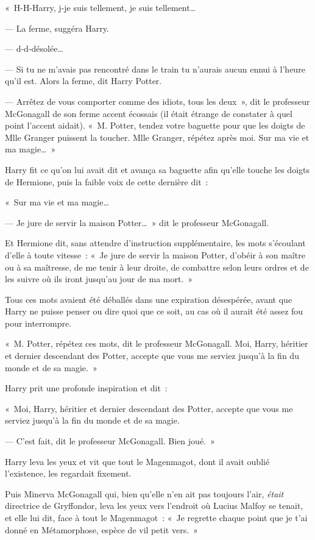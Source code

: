 «~H-H-Harry, j-je suis tellement, je suis tellement…

--- La ferme, suggéra Harry.

--- d-d-désolée…

--- Si tu ne m'avais pas rencontré dans le train tu n'aurais aucun ennui à l'heure qu'il est. Alors la ferme, dit Harry Potter.

--- Arrêtez de vous comporter comme des idiots, tous les deux~», dit le professeur McGonagall de son ferme accent écossais (il était étrange de constater à quel point l'accent aidait). «~M. Potter, tendez votre baguette pour que les doigts de Mlle Granger puissent la toucher. Mlle Granger, répétez après moi. Sur ma vie et ma magie…~»

Harry fit ce qu'on lui avait dit et avança sa baguette afin qu'elle touche les doigts de Hermione, puis la faible voix de cette dernière dit~:

«~Sur ma vie et ma magie…

--- Je jure de servir la maison Potter…~» dit le professeur McGonagall.

Et Hermione dit, sans attendre d'instruction supplémentaire, les mots s'écoulant d'elle à toute vitesse~: «~Je jure de servir la maison Potter, d'obéir à son maître ou à sa maîtresse, de me tenir à leur droite, de combattre selon leurs ordres et de les suivre où ils iront jusqu'au jour de ma mort.~»

Tous ces mots avaient été déballés dans une expiration désespérée, avant que Harry ne puisse penser ou dire quoi que ce soit, au cas où il aurait été assez fou pour interrompre.

«~M. Potter, répétez ces mots, dit le professeur McGonagall. Moi, Harry, héritier et dernier descendant des Potter, accepte que vous me serviez jusqu'à la fin du monde et de sa magie.~»

Harry prit une profonde inspiration et dit~:

«~Moi, Harry, héritier et dernier descendant des Potter, accepte que vous me serviez jusqu'à la fin du monde et de sa magie.

--- C'est fait, dit le professeur McGonagall. Bien joué.~»

Harry leva les yeux et vit que tout le Magenmagot, dont il avait oublié l'existence, les regardait fixement.

Puis Minerva McGonagall qui, bien qu'elle n'en ait pas toujours l'air, \emph{était} directrice de Gryffondor, leva les yeux vers l'endroit où Lucius Malfoy se tenait, et elle lui dit, face à tout le Magenmagot~: «~Je regrette chaque point que je t'ai donné en Métamorphose, espèce de vil petit vers.~»

